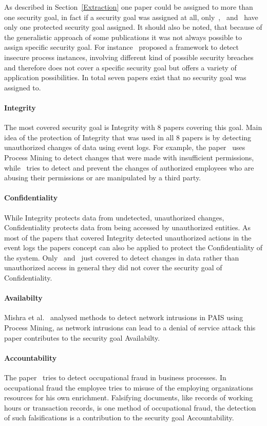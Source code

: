 \documentclass[runningheads]{llncs}
\begin{document}
As described in Section~\ref{Extraction} one paper could be assigned to more than one security goal, in fact if a security goal was assigned at all,
only~\cite{Zaman20192982},~\cite{MozafariMehr202182} and~\cite{Sarno2020} have only one protected security goal assigned.
It should also be noted, that because of the generalistic approach of some publications it was not always possible to assign specific security goal. For instance~\cite{Fazzinga2020} proposed a framework to detect insecure process instances, involving different
kind of possible security breaches and therefore does not cover a specific security goal but offers a variety of application possibilities.
In total seven papers exist that no security goal was assigned to.
\paragraph{Integrity} The most covered security goal is Integrity with 8 papers covering this goal. Main idea of the protection of Integrity that was used in all 8 papers is by detecting unauthorized changes of data using event logs. For example, the paper~\cite{Breitmayer202411}
uses Process Mining to detect changes that were made with insufficient permissions, while~\cite{MacAk2020} tries to detect and prevent the changes of authorized employees who are abusing their permissions or are manipulated by a third party.
\paragraph{Confidentiality} While Integrity protects data from undetected, unauthorized changes, Confidentiality protects data from being accessed by unauthorized entities. As most of the papers that covered Integrity detected unauthorized actions in the event logs
the papers concept can also be applied to protect the Confidentiality of the system. Only~\cite{Sarno2020} and~\cite{Mardani2013} just covered to detect changes in data rather than unauthorized access in general they did not cover the security goal of Confidentiality.
\paragraph{Availabilty} Mishra et al.~\cite{Mishra2018613} analysed methods to detect network intrusions in PAIS using Process Mining, as network intrusions can lead to a denial of service attack this paper contributes to the security goal Availabilty.
\paragraph{Accountability} The paper~\cite{Mardani2013} tries to detect occupational fraud in business processes. In occupational fraud the employee tries to misuse of the employing organizations resources for his own enrichment. Falsifying documents,
like records of working hours or transaction records, is one method of occupational fraud, the detection of such falsifications is a contribution to the security goal Accountability.
\end{document}
